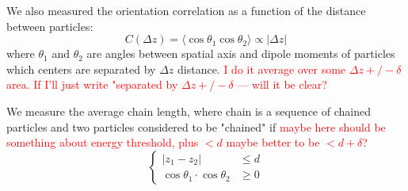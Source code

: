 We also measured the orientation correlation as a function of the distance between particles:
\begin{equation}
	C(\Delta z) = \langle\cos \theta_1 \cos \theta_2\rangle \propto |\Delta z|
\end{equation}
where $\theta_1$ and $\theta_2$ are angles between spatial axis and dipole moments of particles which centers are separated by $\Delta z$ distance. \textcolor{red}{I do it average over some $\Delta z +/- \delta$ area. If I'll just write "separated by $\Delta z +/- \delta$ --- will it be clear?}

We measure the average chain length, where chain is a sequence of chained particles and two particles considered to be "chained" if 
\textcolor{red}{maybe here should be something about energy threshold, plus $<d$ maybe better to be $<d + \delta$?}
\begin{equation}
\begin{cases}
	|z_1 - z_2| &\leq d \\
	\cos \theta_1 \cdot \cos \theta_2 &\geq 0
\end{cases}
\end{equation}